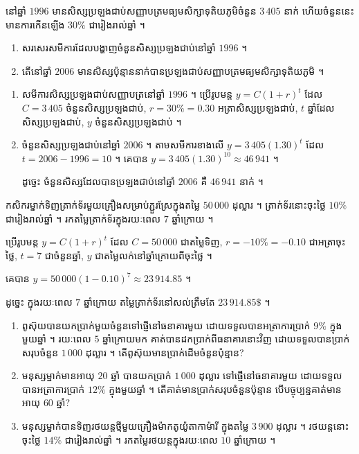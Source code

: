 \begin{example}[លំហាត់គំរូ ៥]
នៅឆ្នាំ $1996$ មានសិស្សប្រឡងជាប់សញ្ញាបត្រមធ្យមសិក្សាទុតិយភូមិចំនួន $3\,405$ នាក់ ហើយចំនួននេះមានការកើនឡើង $30\%$ ជារៀងរាល់ឆ្នាំ ។
\begin{enumerate}[a]
  \item សរសេរសមីការដែលបង្ហាញចំនួនសិស្សប្រឡងជាប់នៅឆ្នាំ $1996$ ។
  \item តើនៅឆ្នាំ $2006$ មានសិស្សប៉ុន្មាននាក់បានប្រឡងជាប់សញ្ញាបត្រមធ្យមសិក្សាទុតិយភូមិ ។
\end{enumerate}
\end{example}
\ans
\begin{enumerate}[a]
  \item សមីការសិស្សប្រឡងជាប់សញ្ញាបត្រនៅឆ្នាំ $1996$ ។ ប្រើរូបមន្ត $y = C(1 + r)^t$ ដែល $C = 3\,405$ ចំនួនសិស្សប្រឡងជាប់, $r = 30\% = 0.30$ អត្រាសិស្សប្រឡងជាប់, $t$ ឆ្នាំដែលសិស្សប្រឡងជាប់, $y$ ចំនួនសិស្សប្រឡងជាប់ ។
  \item ចំនួនសិស្សប្រឡងជាប់នៅឆ្នាំ $2006$ ។ តាមសមីការខាងលើ $y = 3\,405(1.30)^t$ ដែល $t = 2006 - 1996 = 10$ ។ គេបាន $y = 3\,405(1.30)^{10} \approx 46\,941$ ។

  ដូច្នេះ ចំនួនសិស្សដែលបានប្រឡងជាប់នៅឆ្នាំ $2006$ គឺ $46\,941$ នាក់ ។
\end{enumerate}

\begin{example}[លំហាត់គំរូ ៦]
កសិករម្នាក់ទិញត្រាក់ទ័រមួយគ្រឿងសម្រាប់ភ្ជួរស្រែក្នុងតម្លៃ $50\,000$ ដុល្លារ ។ ត្រាក់ទ័រនោះចុះថ្លៃ $10\%$ ជារៀងរាល់ឆ្នាំ ។ រកតម្លៃត្រាក់ទ័រក្នុងរយៈពេល $7$ ឆ្នាំក្រោយ ។
\end{example}
\ans
ប្រើរូបមន្ត $y = C(1 + r)^t$ ដែល $C = 50\,000$ ជាតម្លៃទិញ, $r = -10\% = -0.10$ ជាអត្រាចុះថ្លៃ, $t = 7$ ជាចំនួនឆ្នាំ, $y$ ជាតម្លៃលក់នៅឆ្នាំក្រោយពីចុះថ្លៃ ។

គេបាន $y = 50\,000(1 - 0.10)^7 \approx 23\,914.85$ ។

ដូច្នេះ ក្នុងរយៈពេល $7$ ឆ្នាំក្រោយ តម្លៃត្រាក់ទ័រនៅសល់ត្រឹមតែ $23\,914.85\$$ ។

\begin{pro}
\begin{enumerate}[a]
  \item ពូស៊ុយបានយកប្រាក់មួយចំនួនទៅផ្ញើនៅធនាគារមួយ ដោយទទួលបានអត្រាការប្រាក់ $9\%$ ក្នុងមួយឆ្នាំ ។ រយៈពេល $5$ ឆ្នាំក្រោយមក គាត់បានដកប្រាក់ពីធនាគារនោះវិញ ដោយទទួលបានប្រាក់សរុបចំនួន $1\,000$ ដុល្លារ ។ តើពូស៊ុយមានប្រាក់ដើមចំនួនប៉ុន្មាន?
  \item មនុស្សម្នាក់មានអាយុ $20$ ឆ្នាំ បានយកប្រាក់ $1\,000$ ដុល្លារ ទៅផ្ញើនៅធនាគារមួយ ដោយទទួលបានអត្រាការប្រាក់ $12\%$ ក្នុងមួយឆ្នាំ ។ តើគាត់មានប្រាក់សរុបចំនួនប៉ុន្មាន បើបច្ចុប្បន្នគាត់មានអាយុ $60$ ឆ្នាំ?
  \item មនុស្សម្នាក់បានទិញរថយន្តថ្មីមួយគ្រឿងម៉ាកតូយ៉ូតាកាម៉ារី ក្នុងតម្លៃ $3\,900$ ដុល្លារ ។ រថយន្តនោះចុះថ្លៃ $14\%$ ជារៀងរាល់ឆ្នាំ ។ រកតម្លៃរថយន្តក្នុងរយៈពេល $10$ ឆ្នាំក្រោយ ។
\end{enumerate}
\end{pro}

